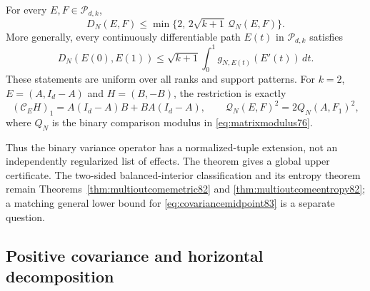 \begin{theorem}
\label{thm:closedcovariance83}
For every $E,F\in\mathcal P_{d,k}$,
\begin{equation}\label{eq:closedcovariance83}
 D_N(E,F)\le
 \min\{2,\,2\sqrt{k+1}\,\mathcal Q_N(E,F)\}.
\end{equation}
More generally, every continuously differentiable path $E(t)$ in
$\mathcal P_{d,k}$ satisfies
\begin{equation}\label{eq:covariancepath83}
 D_N(E(0),E(1))\le
 \sqrt{k+1}\int_0^1g_{N,E(t)}(E'(t))\,dt.
\end{equation}
These statements are uniform over all ranks and support patterns.
For $k=2$, $E=(A,I_d-A)$ and $H=(B,-B)$, the restriction is exactly
\begin{equation}\label{eq:binarycovariance83}
 (\mathcal C_EH)_1=A(I_d-A)B+BA(I_d-A),\qquad
 \mathcal Q_N(E,F)^2=2Q_N(A,F_1)^2,
\end{equation}
where $Q_N$ is the binary comparison modulus in
\eqref{eq:matrixmodulus76}.
\end{theorem}

Thus the binary variance operator has a normalized-tuple extension,
not an independently regularized list of effects.  The theorem gives
a global upper certificate.  The two-sided balanced-interior
classification and its entropy theorem remain
Theorems~\ref{thm:multioutcomemetric82} and
\ref{thm:multioutcomeentropy82}; a matching general lower bound for
\eqref{eq:covariancemidpoint83} is a separate question.

\subsection{Positive covariance and horizontal decomposition}

